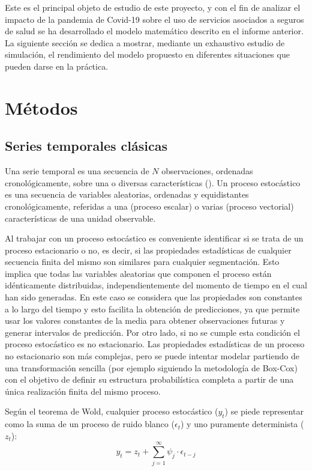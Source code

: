 \documentclass[12pt,twoside]{article} %
\begin{document}
Este es el principal objeto de estudio de este proyecto, y con el fin de analizar el impacto de la pandemia de Covid-19 sobre el uso de servicios asociados a seguros de salud se ha desarrollado el modelo matemático descrito en el informe anterior. La siguiente sección se dedica a mostrar, mediante un exhaustivo estudio de simulación, el rendimiento del modelo propuesto en diferentes situaciones que pueden darse en la práctica.

\section{Métodos}
\subsection{Series temporales clásicas}
Una serie temporal es una secuencia de $N$ observaciones, ordenadas cronológicamente, sobre una o diversas características (\cite{Pena2005}). Un proceso estocástico es una secuencia de variables aleatorias, ordenadas y equidistantes cronológicamente, referidas a una (proceso escalar) o varias (proceso vectorial) características de una unidad observable.

Al trabajar con un proceso estocástico es conveniente identificar si se trata de un proceso estacionario o no, es decir, si las propiedades estadísticas de cualquier secuencia finita del mismo son similares para cualquier segmentación. Esto implica que todas las variables aleatorias que componen el proceso están idénticamente distribuidas, independientemente del momento de tiempo en el cual han sido generadas. En este caso se considera que las propiedades son constantes a lo largo del tiempo y esto facilita la obtención de predicciones, ya que permite usar los valores constantes de la media para obtener observaciones futuras y generar intervalos de predicción. Por otro lado, si no se cumple esta condición el proceso estocástico es no estacionario. Las propiedades estadísticas de un proceso no estacionario son más complejas, pero se puede intentar modelar partiendo de una transformación sencilla (por ejemplo siguiendo la metodología de Box-Cox) con el objetivo de definir su estructura probabilística completa a partir de una única realización finita del mismo proceso.

Según el teorema de Wold, cualquier proceso estocástico ($y_t$) se piede representar como la suma de un proceso de ruido blanco ($\epsilon_t$) y uno puramente determinista ($z_t$):
\begin{equation}
 y_t = z_t + \sum_{j=1}^{\infty} \psi_j \cdot \epsilon_{t-j}
\end{equation}
\end{document}
